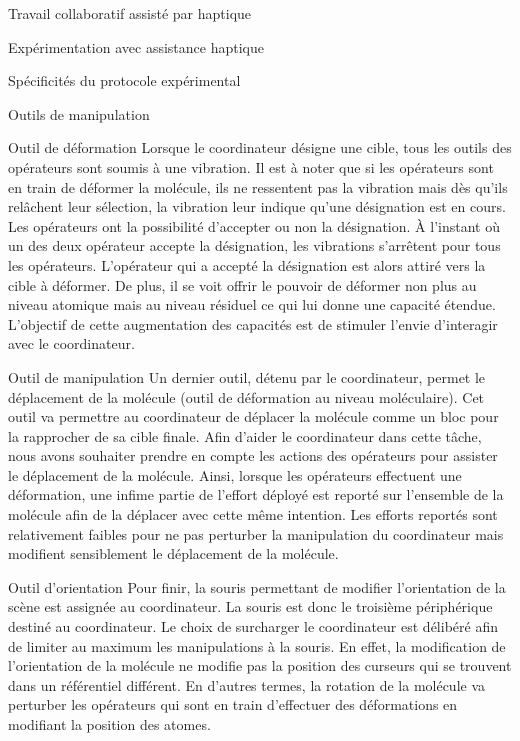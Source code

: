\documentclass[myfrancais]{mythesis}
\begin{document}
\begin{mychapter}{Travail collaboratif assisté par haptique}
\begin{mysection}{Expérimentation avec assistance haptique}
\begin{mysubsection}{Spécificités du protocole expérimental}
\begin{mysubsubsection}{Outils de manipulation}
\begin{myparagraph}{Outil de déformation}
						Lorsque le coordinateur désigne une cible, tous les outils des opérateurs sont soumis à une vibration.
						Il est à noter que si les opérateurs sont en train de déformer la molécule, ils ne ressentent pas la vibration mais dès qu'ils relâchent leur sélection, la vibration leur indique qu'une désignation est en cours.
						Les opérateurs ont la possibilité d'accepter ou non la désignation.
						À l'instant où un des deux opérateur accepte la désignation, les vibrations s'arrêtent pour tous les opérateurs.
						L'opérateur qui a accepté la désignation est alors attiré vers la cible à déformer.
						De plus, il se voit offrir le pouvoir de déformer non plus au niveau atomique mais au niveau résiduel ce qui lui donne une capacité étendue.
						L'objectif de cette augmentation des capacités est de stimuler l'envie d'interagir avec le coordinateur.
					\end{myparagraph}
					\begin{myparagraph}{Outil de manipulation}
						Un dernier outil, détenu par le coordinateur, permet le déplacement de la molécule (outil de déformation au niveau moléculaire).
						Cet outil va permettre au coordinateur de déplacer la molécule comme un bloc pour la rapprocher de sa cible finale.
						Afin d'aider le coordinateur dans cette tâche, nous avons souhaiter prendre en compte les actions des opérateurs pour assister le déplacement de la molécule.
						Ainsi, lorsque les opérateurs effectuent une déformation, une infime partie de l'effort déployé est reporté sur l'ensemble de la molécule afin de la déplacer avec cette même intention.
						Les efforts reportés sont relativement faibles pour ne pas perturber la manipulation du coordinateur mais modifient sensiblement le déplacement de la molécule.
					\end{myparagraph}
					\begin{myparagraph}{Outil d'orientation}
						Pour finir, la souris permettant de modifier l'orientation de la scène est assignée au coordinateur.
						La souris est donc le troisième périphérique destiné au coordinateur.
						Le choix de surcharger le coordinateur est délibéré afin de limiter au maximum les manipulations à la souris.
						En effet, la modification de l'orientation de la molécule ne modifie pas la position des curseurs qui se trouvent dans un référentiel différent.
						En d'autres termes, la rotation de la molécule va perturber les opérateurs qui sont en train d'effectuer des déformations en modifiant la position des atomes.

\end{myparagraph}
\end{mysubsubsection}
\end{mysubsection}
\end{mysection}
\end{mychapter}
\end{document}
